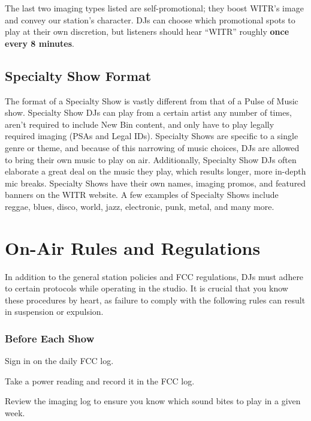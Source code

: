 \documentclass{witrman}
\begin{document}
The last two imaging types listed are self-promotional; they boost WITR's image
and convey our station's character. DJs can choose which promotional spots to
play at their own discretion, but listeners should hear ``WITR'' roughly
\textbf{once every 8 minutes}.


\section{Specialty Show Format}

The format of a Specialty Show is vastly different from that of a Pulse of Music
show.  Specialty Show DJs can play from a certain artist any number of times,
aren't required to include New Bin content, and only have to play legally
required imaging (PSAs and Legal IDs).  Specialty Shows are specific to a single
genre or theme, and because of this narrowing of music choices, DJs are allowed
to bring their own music to play on air.  Additionally, Specialty Show DJs often
elaborate a great deal on the music they play, which results longer, more
in-depth mic breaks.  Specialty Shows have their own names, imaging promos, and
featured banners on the WITR website.  A few examples of Specialty Shows include
reggae, blues, disco, world, jazz, electronic, punk, metal, and many more.



\chapter{On-Air Rules and Regulations}

In addition to the general station policies and FCC regulations, DJs must adhere
to certain protocols while operating in the studio.  It is crucial that you know
these procedures by heart, as failure to comply with the following rules can
result in suspension or expulsion.

\subsection{Before Each Show}
\begin{skinnyenumerate}
    \item Sign in on the daily FCC log.
    \item Take a power reading and record it in the FCC log.
    \item Review the imaging log to ensure you know which sound bites to play in
        a given week.
\end{skinnyenumerate}
\end{document}
